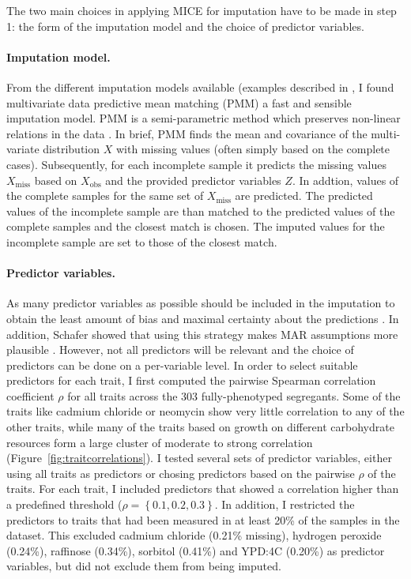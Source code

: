 \noindent The two main choices in applying MICE for imputation have to be made in step 1: the form of the imputation model and the choice of predictor variables. 

\paragraph{Imputation model.} From the different imputation models available (examples described in \citep{vanBuuren2011}, I found multivariate data predictive mean matching (PMM) a fast and sensible imputation model. PMM is a semi-parametric method which preserves non-linear relations in the data \citep{Little1988,vanBuuren2011}. In brief, PMM finds the mean and covariance of the multi-variate distribution \(X\) with missing values (often simply based on the complete cases). Subsequently, for each incomplete sample it predicts the missing values \(X_\text{miss}\) based on \(X_\text{obs}\)  and the provided predictor variables \(Z\). In addtion, values of the complete samples for the same set of \(X_\text{miss}\) are predicted. The predicted values of the incomplete sample are than matched to the predicted values of the complete samples and the closest match is chosen. The imputed values for the incomplete sample are set to those of the closest match\citep{Little1988}. 

\paragraph{Predictor variables.} As many predictor variables as possible should be included in the imputation to obtain the least amount of bias and maximal certainty about the predictions \citep{Collins2001}. In addition, Schafer showed that using this strategy makes MAR assumptions more plausible \citep{Schafer1997}. However, not all predictors will be relevant and the choice of predictors can be done on a per-variable level. In order to select suitable predictors for each trait, I first computed the pairwise Spearman correlation coefficient \(\rho\) for all traits across the 303 fully-phenotyped segregants. Some of the traits like cadmium chloride or neomycin show very little correlation to any of the other traits, while many of the traits based on growth on different carbohydrate resources form a large cluster of moderate to strong correlation (Figure~\ref{fig:traitcorrelations}). 
I tested several sets of predictor variables, either using all traits as predictors or chosing predictors based on the pairwise \(\rho\) of the traits. For each trait, I included predictors that showed a correlation higher than a predefined threshold (\(\rho =\left\{0.1, 0.2, 0.3\right\}\). In addition, I restricted the predictors to traits that had been measured in at least 20\% of the samples in the dataset. This excluded cadmium chloride  (0.21\% missing), hydrogen peroxide (0.24\%), raffinose (0.34\%), sorbitol (0.41\%) and YPD:4C (0.20\%) as predictor variables, but did not exclude them from being imputed.

